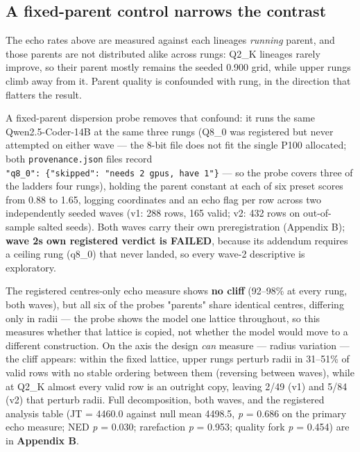 \hypertarget{a-fixed-parent-control-narrows-the-contrast}{%
\subsection{A fixed-parent control narrows the contrast}\label{a-fixed-parent-control-narrows-the-contrast}}

The echo rates above are measured against each lineage\textquotesingle s \emph{running} parent, and those parents are not distributed alike across rungs: Q2\_K lineages rarely improve, so their parent mostly remains the seeded 0.900 grid, while upper rungs climb away from it. Parent quality is confounded with rung, in the direction that flatters the result.

A fixed-parent dispersion probe removes that confound: it runs the same Qwen2.5-Coder-14B at the same three rungs (Q8\_0 was registered but never attempted on either wave --- the 8-bit file does not fit the single P100 allocated; both \texttt{provenance.json} files record \texttt{"q8\_0":\ \{"skipped":\ "needs\ 2\ gpus,\ have\ 1"\}} --- so the probe covers three of the ladder\textquotesingle s four rungs), holding the parent constant at each of six preset scores from 0.88 to 1.65, logging coordinates and an echo flag per row across two independently seeded waves (v1: 288 rows, 165 valid; v2: 432 rows on out-of-sample salted seeds). Both waves carry their own preregistration (Appendix B); \textbf{wave 2\textquotesingle s own registered verdict is FAILED}, because its addendum requires a ceiling rung (q8\_0) that never landed, so every wave-2 descriptive is exploratory.

The registered centres-only echo measure shows \textbf{no cliff} (92--98\% at every rung, both waves), but all six of the probe\textquotesingle s "parents" share identical centres, differing only in radii --- the probe shows the model one lattice throughout, so this measures whether that lattice is copied, not whether the model would move to a different construction. On the axis the design \emph{can} measure --- radius variation --- the cliff appears: within the fixed lattice, upper rungs perturb radii in 31--51\% of valid rows with no stable ordering between them (reversing between waves), while at Q2\_K almost every valid row is an outright copy, leaving 2/49 (v1) and 5/84 (v2) that perturb radii. Full decomposition, both waves, and the registered analysis table (JT = 4460.0 against null mean 4498.5, \emph{p} = 0.686 on the primary echo measure; NED \emph{p} = 0.030; rarefaction \emph{p} = 0.953; quality fork \emph{p} = 0.454) are in \textbf{Appendix B}.

